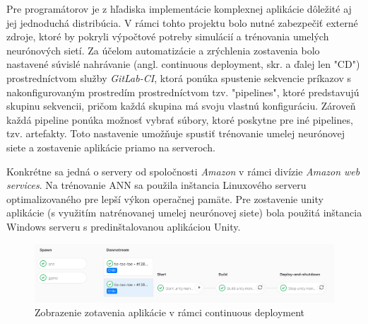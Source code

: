 Pre programátorov je z hľadiska implementácie komplexnej aplikácie dôležité aj jej jednoduchá distribúcia.
V rámci tohto projektu bolo nutné zabezpečiť externé zdroje, ktoré by pokryli výpočtové potreby simulácií a trénovania
umelých neurónových sietí.
Za účelom automatizácie a zrýchlenia zostavenia bolo nastavené súvislé nahrávanie (angl. continuous deployment, skr. a
ďalej len "CD") prostredníctvom služby \emph{GitLab-CI}\cite{gitlab_ci}, ktorá ponúka spustenie sekvencie príkazov s
nakonfigurovaným prostredím prostredníctvom tzv. "pipelines", ktoré predstavujú skupinu sekvencii, pričom každá skupina
má svoju vlastnú konfiguráciu.
Zároveň každá pipeline ponúka možnosť vybrať súbory, ktoré poskytne pre iné pipelines, tzv. artefakty.
Toto nastavenie umožňuje spustiť trénovanie umelej neurónovej siete a zostavenie aplikácie priamo na serveroch.

Konkrétne sa jedná o servery od spoločnosti \emph{Amazon} v rámci divízie \emph{Amazon web services}\cite{aws}.
Na trénovanie ANN sa použila inštancia Linuxového serveru optimalizovaného pre lepší výkon operačnej pamäte.
Pre zostavenie unity aplikácie (s využitím natrénovanej umelej neurónovej siete) bola použitá inštancia Windows
serveru s predinštalovanou aplikáciou Unity.
\begin{figure}[H]
    \centering
    \includegraphics[width=1\textwidth]{images/impl-cd.png}
    \caption{Zobrazenie zotavenia aplikácie v rámci continuous deployment}
\end{figure}\label{figure:cd}

